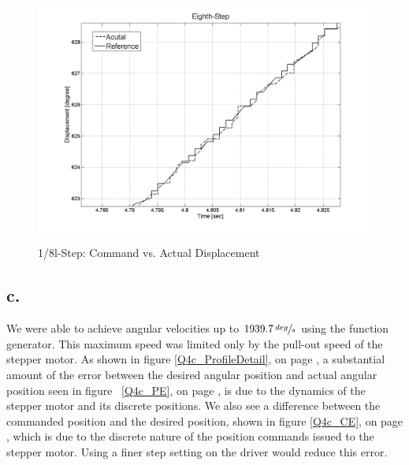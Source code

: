 \documentclass{article}
\theoremstyle{plain}
\theoremstyle{definition}
\theoremstyle{remark}
\begin{document}
\begin{figure}[htb]
\begin{center}
\includegraphics[width=14cm]{Q4_eighth_step_L.png}
\caption{1/8l-Step: Command vs. Actual Displacement} \label{tex}
\label{fig:q4_18}
\end{center}
\end{figure}

\clearpage 


\subsection*{c.}

We were able to achieve angular velocities up to $1939.7 \, \sfrac{deg}{s}$ using the function generator.  This maximum speed was limited only by the pull-out speed of the stepper motor.  As shown in figure \ref{Q4c_ProfileDetail}, on  page \pageref{Q4c_ProfileDetail}, a substantial amount of the error between the desired angular position and actual angular position seen in figure ~\ref{Q4c_PE}, on page \pageref{Q4c_PE}, is due to the dynamics of the stepper motor and its discrete positions.  We also see a difference between the commanded position and the desired position, shown in figure \ref{Q4c_CE}, on page \pageref{Q4c_CE}, which is due to the discrete nature of the position commands issued to the stepper motor.  Using a finer step setting on the driver would reduce this error.\\
\end{document}
